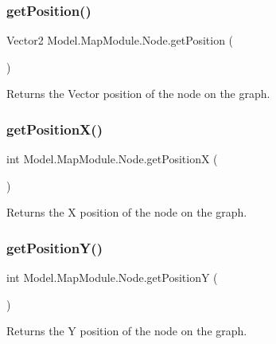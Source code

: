 \subsubsection{\texorpdfstring{get\+Position()}{getPosition()}}
{\footnotesize\ttfamily Vector2 Model.\+Map\+Module.\+Node.\+get\+Position (\begin{DoxyParamCaption}{ }\end{DoxyParamCaption})\hspace{0.3cm}{\ttfamily [inline]}}

Returns the Vector position of the node on the graph. \hypertarget{class_model_1_1_map_module_1_1_node_aafda1d229261c9bb17d16bf3f33f8362}{}\label{class_model_1_1_map_module_1_1_node_aafda1d229261c9bb17d16bf3f33f8362} 
\subsubsection{\texorpdfstring{get\+Position\+X()}{getPositionX()}}
{\footnotesize\ttfamily int Model.\+Map\+Module.\+Node.\+get\+PositionX (\begin{DoxyParamCaption}{ }\end{DoxyParamCaption})\hspace{0.3cm}{\ttfamily [inline]}}

Returns the X position of the node on the graph. \hypertarget{class_model_1_1_map_module_1_1_node_a6c0463ae7d2efde9eab77d67b520bce4}{}\label{class_model_1_1_map_module_1_1_node_a6c0463ae7d2efde9eab77d67b520bce4} 
\subsubsection{\texorpdfstring{get\+Position\+Y()}{getPositionY()}}
{\footnotesize\ttfamily int Model.\+Map\+Module.\+Node.\+get\+PositionY (\begin{DoxyParamCaption}{ }\end{DoxyParamCaption})\hspace{0.3cm}{\ttfamily [inline]}}

Returns the Y position of the node on the graph. \hypertarget{class_model_1_1_map_module_1_1_node_a1f48521054f542a83331e7d35b1340bb}{}\label{class_model_1_1_map_module_1_1_node_a1f48521054f542a83331e7d35b1340bb} 
